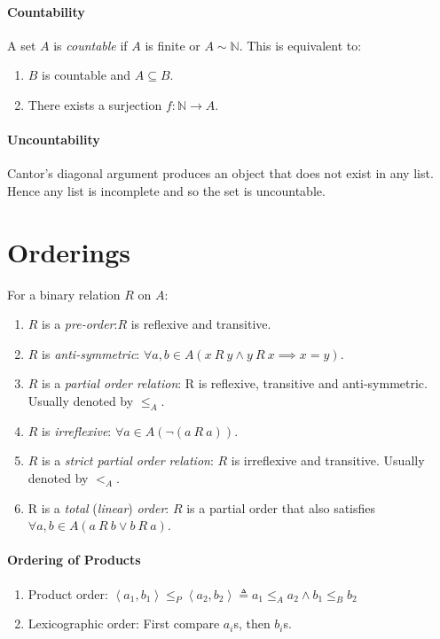 \documentclass[10pt,twoside,twocolumn]{article}
\newcommand{\N}[0]{\mathds{N}} %
\begin{document}
\paragraph{Countability}

A set $A$ is \emph{countable} if $A$ is finite or $A\sim\N$. This
is equivalent to:
\begin{enumerate}
\item $B$ is countable and $A\subseteq B$.
\item There exists a surjection $f:\N\rightarrow A$.
\end{enumerate}

\paragraph{Uncountability}

Cantor's diagonal argument produces an object that does not exist
in any list. Hence any list is incomplete and so the set is uncountable.


\section{Orderings}

For a binary relation $R$ on $A$:
\begin{enumerate}
\item $R$ is a \emph{pre-order}:$R$ is reflexive and transitive.
\item $R$ is \emph{anti-symmetric}: $\forall a,b\in A\left(x\:R\:y\land y\:R\:x\implies x=y\right)$.
\item $R$ is a \emph{partial order relation}: R is reflexive, transitive
and anti-symmetric. Usually denoted by $\leq_{A}$.
\item $R$ is \emph{irreflexive}: $\forall a\in A\left(\lnot\left(a\:R\:a\right)\right)$.
\item $R$ is a \emph{strict partial order relation}: $R$ is irreflexive
and transitive. Usually denoted by $<_{A}$.
\item R is a \emph{total} (\emph{linear}) \emph{order}: $R$ is a partial
order that also satisfies $\forall a,b\in A\left(a\:R\:b\lor b\:R\:a\right)$.
\end{enumerate}

\paragraph{Ordering of Products}
\begin{enumerate}
\item Product order: $\left\langle a_{1},b_{1}\right\rangle \leq_{P}\left\langle a_{2},b_{2}\right\rangle \triangleq a_{1}\leq_{A}a_{2}\land b_{1}\leq_{B}b_{2}$
\item Lexicographic order: First compare $a_{i}$s, then $b_{i}$s.
\end{enumerate}
\end{document}
